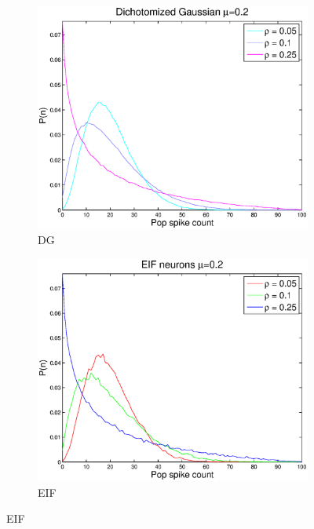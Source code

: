 \documentclass[11pt]{article}
\begin{document}
\begin{figure}[H]
	\begin{subfigure}[h]{0.5\textwidth}
	\centering
	\includegraphics[width=\textwidth]{../Figures/DG/DG_Macke_2a_mu_02}
	\caption{DG}
	\label{fig5}
	\end{subfigure}
	\begin{subfigure}[h]{0.5\textwidth}
	\centering
	\includegraphics[width=\textwidth]{../Figures/EIF/EIF_Macke_2a_mu_02}
	\caption{EIF}
	\label{fig6}
	\end{subfigure}

\end{figure}
\end{document}
